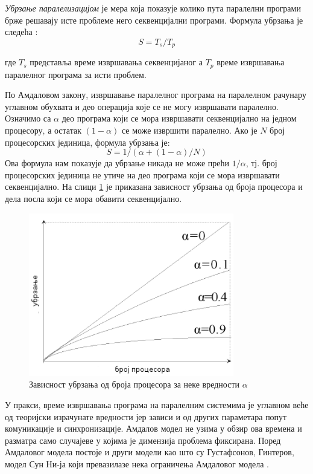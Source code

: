 \documentclass[12pt,oneside]{memoir}
\begin{document}
     \emph{Убрзање паралелизацијом} је мера која показује колико пута паралелни програми брже решавају исте проблеме него секвенцијални програми. Формула убрзања је следећа \cite{par_various}:
 	$$ S = T_s/T_p $$
 	
\noindent где $ T_s $ представља време извршавања секвенцијаног а $ T_p $ време извршавања паралелног програма за исти проблем. 

 По Амдаловом закону, извршавање паралелног програма на паралелном рачунару углавном обухвата и део операција које се не могу извршавати паралелно. Означимо са $ \alpha $ део програма који се мора извршавати секвенцијално на једном процесору, а остатак $ (1 - \alpha)$ се може извршити паралелно. Ако је $ N $ број процесорских јединица, формула убрзања је: 
 	$$ S = 1 / ( \alpha + (1-\alpha)/N)$$
Ова формула нам показује да убрзање никада не може прећи $ 1/\alpha $, тј. број процесорских јединица не утиче на део програма који се мора извршавати секвенцијално. На слици \ref{fig:amdal} је приказана зависност убрзања од броја процесора и дела посла који се мора обавити секвенцијално.

 \begin{figure}[!ht]
  \centering
  \includegraphics[width=0.8\textwidth]{img/amdal.png}
  \caption{Зависност убрзања од броја процесора за неке вредности $ \alpha $ }
  \label{fig:amdal}
\end{figure}



 У пракси, време извршавања програма на паралелним системима је углавном веће од теоријски израчунате вредности јер зависи и од других параметара попут комуникације и синхронизације. Амдалов модел не узима у обзир ова времена и разматра само случајеве у којима је димензија проблема фиксирана. Поред Амдаловог модела постоје и други модели као што су Густафсонов, Гинтеров, модел Сун Ни-ја који превазилазе нека ограничења Амдаловог модела \cite{performance}.
 	 
\end{document}
